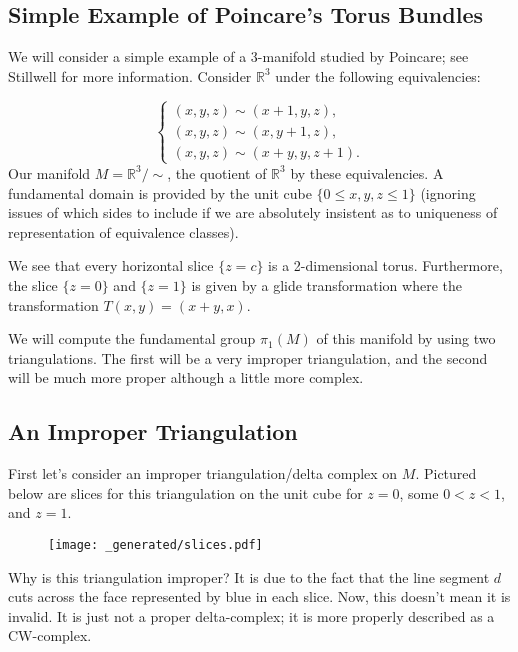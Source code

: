 \def\parentDir{Topology/SimplePoincareTorusBundle}

\subsection{Simple Example of Poincare's Torus Bundles}

We will consider a simple example of a 3-manifold studied by Poincare; see Stillwell 
\cite{stillwell3Mnflds} for more information. Consider \(\mathbb R^3\) under the following equivalencies:

\begin{equation}
\begin{cases}
(x, y, z) \sim (x + 1, y, z), \\
(x, y, z) \sim (x, y + 1, z), \\
(x, y, z) \sim (x + y, y, z + 1).
\end{cases}
\end{equation}
Our manifold \(M = \mathbb R^3 / \sim\), the quotient of \(\mathbb R^3\) by these equivalencies. A fundamental domain is 
provided by the unit cube \(\{0 \leq x, y,z \leq 1\}\) (ignoring issues of which sides to include if we are absolutely insistent
as to uniqueness of representation of equivalence classes).  

We see that every horizontal slice \(\{z = c\}\) is a 2-dimensional torus. Furthermore, the slice \(\{z = 0\}\) and \(\{z = 1\}\)
is given by a glide transformation where the transformation \(T(x, y) = (x + y, x)\).

We will compute the fundamental group \(\pi_1(M)\) of this manifold by using two triangulations. The first will be a very improper
triangulation, and the second will be much more proper although a little more complex.

\subsection*{An Improper Triangulation}

First let's consider an improper triangulation/delta complex on \(M\). Pictured below are slices for this triangulation on the unit cube for
\(z = 0\), some \(0 < z < 1\), and \(z = 1\).

\begin{figure}[H]
\centering
\texttt{[image: \_generated/slices.pdf]}
\end{figure}

Why is this triangulation improper? It is due to the fact that the line segment \(d\) cuts across the face represented by blue in each slice.
Now, this doesn't mean it is invalid. It is just not a proper delta-complex; it is more properly described as a CW-complex.

